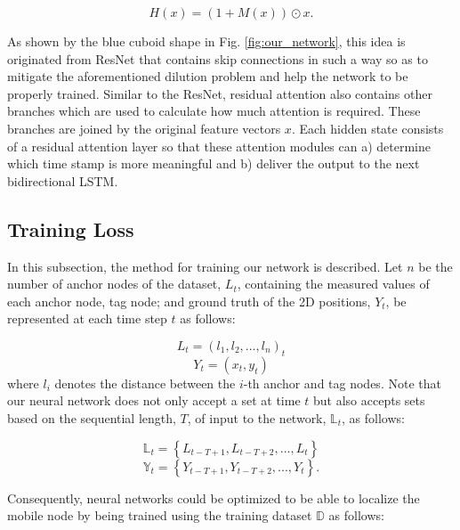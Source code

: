 \documentclass[letterpaper, 10 pt, conference]{ieeeconf}
\begin{document}
\begin{equation}
H(x)=\left(1+M(x)\right)\odot x.
\end{equation} 

As shown by the blue cuboid shape in Fig. \ref{fig:our_network}, this idea is originated from ResNet \cite{he2016deep} that contains skip connections in such a way so as to mitigate the aforementioned dilution problem and help the network to be properly trained. Similar to the ResNet, residual attention also contains other branches which are used to calculate how much attention is required. These branches are joined by the original feature vectors $x$. Each hidden state consists of a residual attention layer so that these attention modules can a) determine which time stamp is more meaningful and b) deliver the output to the next bidirectional LSTM.

\subsection{Training Loss}

In this subsection, the method for training our network is described. Let $n$ be the number of anchor nodes of the dataset, $L_{t}$, containing the measured values of each anchor node, tag node; and ground truth of the 2D positions, $Y_t$, be represented at each time step $t$ as follows: 

\begin{equation}
L_{t} = (l_{1}, l_{2}, ..., l_{n})_{t}
\end{equation}
\begin{equation}
Y_t = (x_t, y_t)
\end{equation}
where $l_{i}$ denotes the distance between the $i$-th anchor and tag nodes. Note that our neural network does not only accept a set at time $t$ but also accepts sets based on the sequential length, $T$, of input to the network, $\mathbb{L}_t$, as follows:

\begin{equation}
\mathbb{L}_t = \left\{L_{t-T+1}, L_{t-T+2}, ..., L_t\right\} 
\end{equation}
\begin{equation}
\mathbb{Y}_t = \left\{Y_{t-T+1}, Y_{t-T+2}, ..., Y_t\right\}.
\end{equation}

Consequently, neural networks could be optimized to be able to localize the mobile node by being trained using the training dataset $\mathbb{D}$ as follows:  
\end{document}
